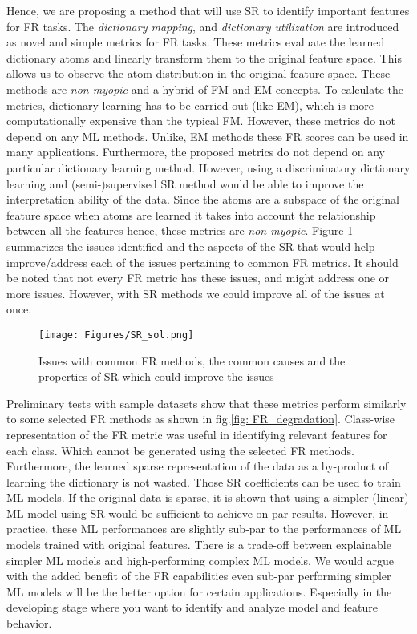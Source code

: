 \documentclass[11pt]{article}
\begin{document}
Hence, we are proposing a method that will use SR to identify important features for FR tasks. The \textit{dictionary mapping}, and \textit{dictionary utilization} are introduced as novel and simple metrics for FR tasks. These metrics evaluate the learned dictionary atoms and linearly transform them to the original feature space. This allows us to observe the atom distribution in the original feature space. These methods are \textit{non-myopic} and a hybrid of FM and EM concepts. To calculate the metrics, dictionary learning has to be carried out (like EM), which is more computationally expensive than the typical FM. However, these metrics do not depend on any ML methods. Unlike, EM methods these FR scores can be used in many applications. Furthermore, the proposed metrics do not depend on any particular dictionary learning method. However, using a discriminatory dictionary learning and (semi-)supervised SR method would be able to improve the interpretation ability of the data. Since the atoms are a subspace of the original feature space when atoms are learned it takes into account the relationship between all the features hence, these metrics are \textit{non-myopic}. Figure \ref{fig: SR_sol} summarizes the issues identified and the aspects of the SR that would help improve/address each of the issues pertaining to common FR metrics. It should be noted that not every FR metric has these issues, and might address one or more issues. However, with SR methods we could improve all of the issues at once.

\begin{figure}[!t]
    \centering
    \texttt{[image: Figures/SR\_sol.png]}
    \caption{Issues with common FR methods, the common causes and the properties of SR which could improve the issues}
    \label{fig: SR_sol}
\end{figure}

Preliminary tests with sample datasets show that these metrics perform similarly to some selected FR methods as shown in fig.\ref{fig: FR_degradation}. Class-wise representation of the FR metric was useful in identifying relevant features for each class. Which cannot be generated using the selected FR methods. Furthermore, the learned sparse representation of the data as a by-product of learning the dictionary is not wasted. Those SR coefficients can be used to train ML models. If the original data is sparse, it is shown that using a simpler (linear) ML model using SR would be sufficient to achieve on-par results. However, in practice, these ML performances are slightly sub-par to the performances of ML models trained with original features. There is a trade-off between explainable simpler ML models and high-performing complex ML models. We would argue with the added benefit of the FR capabilities even sub-par performing simpler ML models will be the better option for certain applications. Especially in the developing stage where you want to identify and analyze model and feature behavior.
\end{document}
